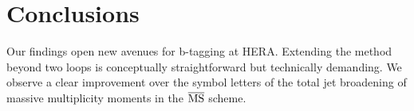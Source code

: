 \section{Conclusions}\label{sec:conclusions}

Our findings open new avenues for b-tagging at HERA. Extending the
method beyond two loops is conceptually straightforward but technically
demanding. We observe a clear improvement over the symbol letters of the
total jet broadening of massive multiplicity moments in the
$\overline{\rm MS}$ scheme.

